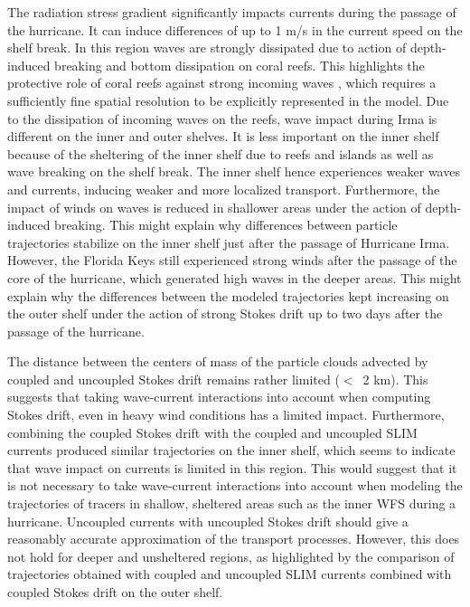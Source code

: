 \documentclass[preprint,12pt,authoryear]{elsarticle}
\begin{document}
The radiation stress gradient significantly impacts currents during the passage of the hurricane. It can induce differences of up to 1 m/s in the current speed on the shelf break. In this region waves are strongly dissipated due to action of depth-induced breaking and bottom dissipation on coral reefs. This highlights the protective role of coral reefs against strong incoming waves \citep{lowe2005spectral}, which requires a sufficiently fine spatial resolution to be  explicitly represented in the model. Due to the dissipation of incoming waves on the reefs, wave impact during Irma is different on the inner and outer shelves. It is less important on the inner shelf because of the sheltering of the inner shelf due to reefs and islands as well as wave breaking on the shelf break. The inner shelf hence experiences weaker waves and currents, inducing weaker and more localized transport. Furthermore, the impact of winds on waves is reduced in shallower areas under the action of depth-induced breaking. This might explain why differences between particle trajectories stabilize on the inner shelf just after the passage of Hurricane Irma. However, the Florida Keys still experienced strong winds after the passage of the core of the hurricane, which generated high waves in the deeper areas. This might explain why the differences between the modeled trajectories kept increasing on the outer shelf under the action of strong Stokes drift up to two days after the passage of the hurricane.

The distance between the centers of mass of the particle clouds advected by coupled and uncoupled Stokes drift remains rather limited ($<$~2 km). This suggests that taking wave-current interactions into account when computing Stokes drift, even in heavy wind conditions has a limited impact. Furthermore, combining the coupled Stokes drift with the coupled and uncoupled SLIM currents produced similar trajectories on the inner shelf, which seems to indicate that wave impact on currents is limited in this region. This would suggest that it is not necessary to take wave-current interactions into account when modeling the trajectories of tracers in shallow, sheltered areas such as the inner WFS during a hurricane. Uncoupled currents with uncoupled Stokes drift should give a reasonably accurate approximation of the transport processes. However, this does not hold for deeper and unsheltered regions, as highlighted by the comparison of trajectories obtained with coupled and uncoupled SLIM currents combined with coupled Stokes drift on the outer shelf.
\end{document}
